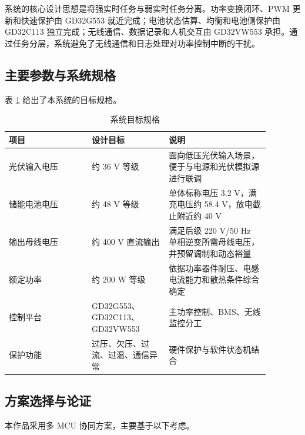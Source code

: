 系统的核心设计思想是将强实时任务与弱实时任务分离。功率变换闭环、PWM 更新和快速保护由 GD32G553 就近完成；电池状态估算、均衡和电池侧保护由 GD32C113 独立完成；无线通信、数据记录和人机交互由 GD32VW553 承担。通过任务分层，系统避免了无线通信和日志处理对功率控制中断的干扰。


\subsection{主要参数与系统规格}

表 \ref{tab:spec} 给出了本系统的目标规格。

\begin{table}[htbp]
  \centering
  \caption{系统目标规格}
  \label{tab:spec}
  \begin{tabular}{|p{0.28\linewidth}|p{0.26\linewidth}|p{0.34\linewidth}|}
    \hline
    \rule{0pt}{1.15cm}项目 & 设计目标 & 说明 \\
    \hline
    \rule{0pt}{1.15cm}光伏输入电压 & 约 36 V 等级 & 面向低压光伏输入场景，便于与电源和光伏模拟源进行联调 \\
    \hline
    \rule{0pt}{1.15cm}储能电池电压 & 约 48 V 等级 & 单体标称电压 3.2 V，满充电压约 58.4 V，放电截止附近约 40 V \\
    \hline
    \rule{0pt}{1.15cm}输出母线电压 & 约 400 V 直流输出 & 满足后级 220 V/50 Hz 单相逆变所需母线电压，并预留调制和动态裕量 \\
    \hline
    \rule{0pt}{1.15cm}额定功率 & 约 200 W 等级 & 依据功率器件耐压、电感电流能力和散热条件综合确定 \\
    \hline
    \rule{0pt}{1.15cm}控制平台 & GD32G553、GD32C113、GD32VW553 & 主功率控制、BMS、无线监控分工 \\
    \hline
    \rule{0pt}{1.15cm}保护功能 & 过压、欠压、过流、过温、通信异常 & 硬件保护与软件状态机结合 \\
    \hline
  \end{tabular}
\end{table}

\subsection{方案选择与论证}

本作品采用多 MCU 协同方案，主要基于以下考虑。

